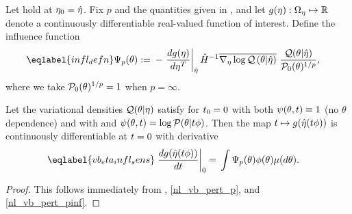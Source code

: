 \begin{cor}
%
Let  hold at $\eta_0 = \hat\eta$.
%
Fix $p$ and the quantities given in , and let $g(\eta):
\Omega_{\eta} \mapsto \mathbb{R}$ denote a continuously differentiable real-valued
function of interest.  Define the influence function
%
\begin{align}\eqlabel{infl_defn}
%
\infl_p(\theta) :={}&
    - \fracat{d g(\eta)}{ d \eta^T}{\etaopt} \hessopt^{-1}
        \lqgradbar{\theta \vert \etaopt}
        \frac{\q(\theta \vert \etaopt)}{\pbase(\theta)^{1/p}},
%
%
%
\end{align}
%
where we take $\mathcal{P}_{0}(\theta)^{1/p}=1$ when $p = \infty$.

Let the variational densities $\mathcal{Q}(\theta \vert \eta)$ satisfy
 for $t_0 = 0$ with both $\psi(\theta, t) \equiv 1$ (no
$\theta$ dependence) and with and $\psi(\theta, t) = \log \mathcal{P}(\theta \vert t
\phi)$. Then the map $t \mapsto g(\hat\eta(t \phi))$ is continuously
differentiable at $t=0$ with derivative
%
\begin{align}\eqlabel{vb_eta_infl_sens}
%
\fracat{d g(\etaopt(\t \phi))}{d \t}{0} ={}&
    \int \infl_p(\theta) \phi(\theta) \mu(d\theta).
%
\end{align}
%
\begin{proof}
%
This follows immediately from , \eqref{nl_vb_pert_p}, and
\eqref{nl_vb_pert_pinf}.
%
\end{proof}
%
\end{cor}





